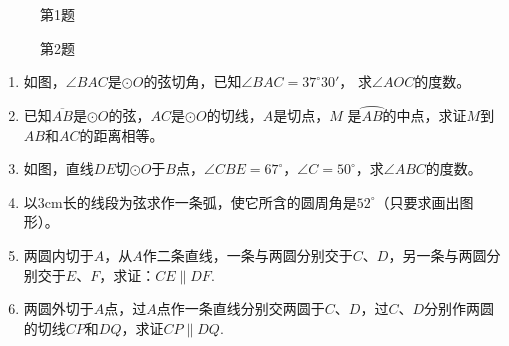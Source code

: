   \begin{figure}[htp]
    \centering
    \begin{minipage}[t]{0.48\textwidth}
    \centering
    \caption*{第1题}
    \end{minipage}
    \begin{minipage}[t]{0.48\textwidth}
    \centering
    \caption*{第2题}
    \end{minipage}
  \end{figure}
  
  
  \begin{ex}
  \begin{enumerate}
    \item 如图，$\angle BAC$是$\odot O$的弦切角，已知$\angle BAC=37^{\circ}30'$，
    求$\angle AOC$的度数。
    \item  已知$\overline{AB}$是$\odot O$的弦，$AC$是$\odot O$的切线，$A$是切点，$M$
    是$\wideparen{AB}$的中点，求证$M$到$AB$和$AC$的距离相等。
    \item  如图，直线$DE$切$\odot O$于$B$点，$\angle CBE=67^{\circ}$，$\angle C=50^{\circ}$，求$\angle ABC$的度数。
    \item  以3cm长的线段为弦求作一条弧，使它所含的圆周角是$52^{\circ}$（只要求画出图形）。
    \item  两圆内切于$A$，从$A$作二条直线，一条与两圆分别交于$C$、$D$，另一条与两圆分别交于$E$、$F$，求证：$CE\parallel DF$.
    \item  两圆外切于$A$点，过$A$点作一条直线分别交两圆于$C$、$D$，过$C$、$D$分别作两圆的切线$CP$和$DQ$，求证$CP\parallel DQ$.
  \end{enumerate}
  \end{ex}
  
